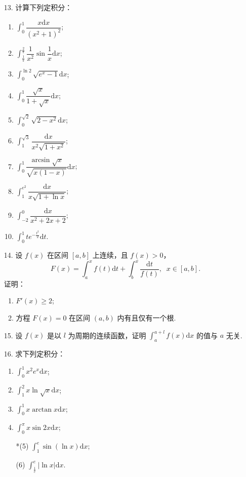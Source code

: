 \begin{enumerate}
    \item[13.] 计算下列定积分：
    \begin{enumerate}[(1)]\setlength{\itemsep}{5pt}\setlength{\topsep}{15pt}
        \item $\displaystyle \int_0^1\dfrac{x\text{d}x}{(x^2+1)^2}$;
        \item $\displaystyle \int_{\frac{1}{\pi}}^{\frac{2}{\pi}}\dfrac{1}{x^2}\sin\dfrac{1}{x}\text{d}x$;
        \item $\displaystyle \int_0^{\ln2}\sqrt{e^x-1}\text{d}x$;
        \item $\displaystyle \int_0^1\dfrac{\sqrt{x}}{1+\sqrt{x}}\text{d}x$;
        \item $\displaystyle \int_0^{\sqrt{2}}\sqrt{2-x^2}\text{d}x$;
        \item $\displaystyle \int_1^{\sqrt{3}}\dfrac{\text{d}x}{x^2\sqrt{1+x^2}}$;
        \item $\displaystyle \int_0^1\dfrac{\arcsin \sqrt{x}}{\sqrt{x(1-x)}}\text{d}x$;
        \item $\displaystyle \int_1^{e^2}\dfrac{\text{d}x}{x\sqrt{1+\ln x}}$;
        \item $\displaystyle \int_{-2}^0\dfrac{\text{d}x}{x^2+2x+2}$;
        \item $\displaystyle \int_0^1te^{-\frac{t^2}{2}}\text{d}t$.
    \end{enumerate}

    \item[14.] 设 $f(x)$ 在区间 $[a,b]$ 上连续，且 $f(x)>0$，
    \[
        F(x)=\int_a^xf(t)\text{d}t+\int_b^x\dfrac{\text{d}t}{f(t)},\;\;x\in[a,b].
    \] 
    证明：
    \begin{enumerate}[(1)]\setlength{\itemsep}{5pt}\setlength{\topsep}{15pt}
        \item $F'(x)\geqslant 2$;
        \item 方程 $F(x)=0$ 在区间 $(a,b)$ 内有且仅有一个根.
    \end{enumerate}

    \item[15.] 设 $f(x)$ 是以 $l$ 为周期的连续函数，证明 $\displaystyle\int_a^{a+l}f(x)\text{d}x$ 的值与 $a$ 无关.
    
    \item[16.] 求下列定积分：
    \begin{enumerate}[(1)]\setlength{\itemsep}{5pt}\setlength{\topsep}{15pt}
        \item $\displaystyle \int_0^1x^2e^x\text{d}x$;
        \item $\displaystyle \int_1^2x\ln\sqrt{x}\text{d}x$;
        \item $\displaystyle \int_0^1x\arctan x\text{d}x$;
        \item $\displaystyle \int_0^{\pi}x\sin 2x\text{d}x$;
        \item[*(5)] $\displaystyle \int_1^e\sin(\ln x)\text{d}x$;
        \item[(6)] $\displaystyle \int_{\frac{1}{e}}^{e}|\ln x|\text{d}x$.
    \end{enumerate}


\end{enumerate}
